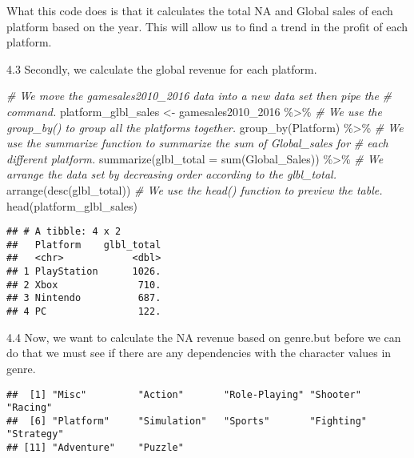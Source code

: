 \documentclass[
]{article}
\newenvironment{Shaded}{\begin{snugshade}}{\end{snugshade}}
\newcommand{\AttributeTok}[1]{\textcolor[rgb]{0.77,0.63,0.00}{#1}}
\newcommand{\CommentTok}[1]{\textcolor[rgb]{0.56,0.35,0.01}{\textit{#1}}}
\newcommand{\FunctionTok}[1]{\textcolor[rgb]{0.00,0.00,0.00}{#1}}
\newcommand{\NormalTok}[1]{#1}
\newcommand{\OtherTok}[1]{\textcolor[rgb]{0.56,0.35,0.01}{#1}}
\newcommand{\SpecialCharTok}[1]{\textcolor[rgb]{0.00,0.00,0.00}{#1}}
\begin{document}
What this code does is that it calculates the total NA and Global sales
of each platform based on the year. This will allow us to find a trend
in the profit of each platform.

4.3 Secondly, we calculate the global revenue for each platform.

\begin{Shaded}
\begin{Highlighting}[]
\CommentTok{\# We move the gamesales2010\_2016 data into a new data set then pipe the}
\CommentTok{\# command.}
\NormalTok{platform\_glbl\_sales }\OtherTok{\textless{}{-}}\NormalTok{ gamesales2010\_2016 }\SpecialCharTok{\%\textgreater{}\%}
    \CommentTok{\# We use the group\_by() to group all the platforms together.}
\FunctionTok{group\_by}\NormalTok{(Platform) }\SpecialCharTok{\%\textgreater{}\%}
    \CommentTok{\# We use the summarize function to summarize the sum of Global\_sales for}
    \CommentTok{\# each different platform.}
\FunctionTok{summarize}\NormalTok{(}\AttributeTok{glbl\_total =} \FunctionTok{sum}\NormalTok{(Global\_Sales)) }\SpecialCharTok{\%\textgreater{}\%}
    \CommentTok{\# We arrange the data set by decreasing order according to the glbl\_total.}
\FunctionTok{arrange}\NormalTok{(}\FunctionTok{desc}\NormalTok{(glbl\_total))}
\CommentTok{\# We use the head() function to preview the table.}
\FunctionTok{head}\NormalTok{(platform\_glbl\_sales)}
\end{Highlighting}
\end{Shaded}

\begin{verbatim}
## # A tibble: 4 x 2
##   Platform    glbl_total
##   <chr>            <dbl>
## 1 PlayStation      1026.
## 2 Xbox              710.
## 3 Nintendo          687.
## 4 PC                122.
\end{verbatim}

4.4 Now, we want to calculate the NA revenue based on genre.but before
we can do that we must see if there are any dependencies with the
character values in genre.

\begin{Shaded}
\end{Shaded}

\begin{verbatim}
##  [1] "Misc"         "Action"       "Role-Playing" "Shooter"      "Racing"      
##  [6] "Platform"     "Simulation"   "Sports"       "Fighting"     "Strategy"    
## [11] "Adventure"    "Puzzle"
\end{verbatim}
\end{document}
